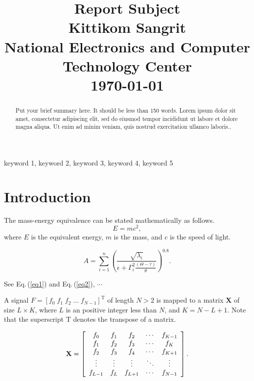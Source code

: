 \documentclass[conference,a4paper]{IEEEtran}
\begin{document}
\title{Report Subject \normalsize\vspace*{10pt} \\Kittikom Sangrit \\National Electronics and Computer Technology Center \\\vspace*{20pt} \today{}}

\maketitle

\begin{abstract}
Put your brief summary here. It should be less than 150 words.
Lorem ipsum dolor sit amet, consectetur adipiscing elit, sed do              
eiusmod tempor incididunt ut labore et dolore magna aliqua. Ut               
enim ad minim veniam, quis nostrud exercitation ullamco laboris..
\end{abstract}

\begin{IEEEkeywords}
keyword 1, keyword 2, keyword 3, keyword 4, keyword 5
\end{IEEEkeywords}

\section{Introduction}

The mass-energy equivalence can be stated mathematically as follows.
\begin{equation}
E = mc^2,
\label{eq1}
\end{equation}
where $E$ is the equivalent energy, $m$ is the mass, and $c$ is the speed of light.

\begin{equation}
A = \sum_{i=1}^{n}\left(\frac{\sqrt{\lambda_i}}{\epsilon+\Gamma^2_i\frac{\left(\Theta-\tau\right)}{\theta}}\right)^{0.8}.
\label{eq2}
\end{equation}

See Eq.\,(\ref{eq1}) and Eq.\,(\ref{eq2}), $\cdots$

A signal $F\!=\![f_0 \; f_1 \; f_2 \; ... \; f_{N-1}]^\textrm{T}$ of length $N\!>\!2$ is mapped to a matrix $\mathbf{X}$ of size $L\!\times\!K$, where $L$ is an positive integer less than $N$, and $K\!=\!N\!-\!L\!+\!1$. Note that the superscript $\text{T}$ denotes the transpose of a matrix.

\begin{equation}
\mathbf{X} = 
\left[ {\begin{array}{*{20}c}
   f_0 & f_1 & f_2 & \cdots & f_{K-1} \\
   f_1 & f_2 & f_3 & \cdots & f_{K} \\
   f_2 & f_3 & f_4 & \cdots & f_{K+1} \\
   \vdots & \vdots & \vdots & \ddots & \vdots \\
   f_{L-1} & f_L & f_{L+1} & \cdots & f_{N-1} \\
 \end{array} } \right].
\label{eq3}
\end{equation}
\end{document}
